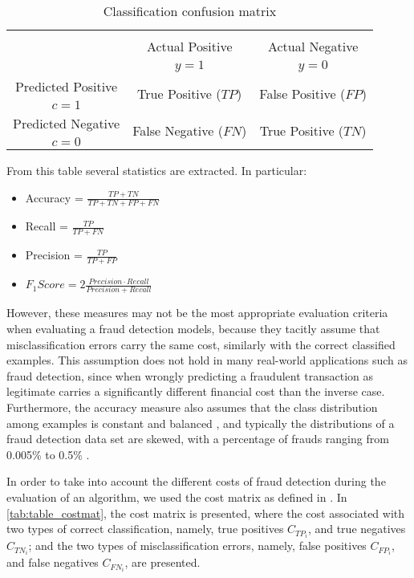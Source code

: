 	\begin{table}[b]
		\caption{Classification confusion matrix}
		\centering
    \begin{tabular}{c|c|c}
      \multicolumn{3}{c}{}\\
			\multicolumn{1}{c|}{}  & Actual Positive& Actual Negative \\
			\multicolumn{1}{c|}{} & $y=1$& $y=0$ \\
			\hline
			Predicted Positive 		& \multirow{ 2}{*}{True Positive ($TP$)} & \multirow{ 
			2}{*}{False Positive ($FP$)} \\
			$c=1$ & &\\
			\hline
			Predicted Negative  	& \multirow{ 2}{*}{False Negative ($FN$)} & \multirow{ 
			2}{*}{True Positive ($TN$)} \\
			$c=0$ & &\\
		\end{tabular}
		\label{confusion}
  \end{table}  

	From this table several statistics are extracted. In particular:
	\begin{itemize}
		\item Accuracy = $\frac{TP+TN}{TP+TN+FP+FN}$
		\item Recall = $\frac{TP}{TP+FN}$
		\item Precision = $\frac{TP}{TP+FP}$
		\item $F_1Score = 2\frac{Precision \cdot Recall}{Precision + Recall}$
	\end{itemize}

	However, these measures may not be the most appropriate evaluation criteria when  evaluating a 
	fraud detection models, because they tacitly assume that misclassification errors carry the same 
	cost, similarly with the correct classified examples. This assumption does not hold in many 
	real-world applications such as fraud detection, since  when wrongly predicting a fraudulent 
	transaction as legitimate carries a significantly different financial cost than the inverse case.
	Furthermore, the accuracy measure also assumes that the class distribution among examples is 
	constant and balanced \citep{Provost1998}, and typically the distributions of a fraud detection 
	data set are skewed, with a percentage of frauds ranging from 0.005\% to 0.5\% 
	\citep{Gadi2008,Bhattacharyya2011}.

	In order to take into account the different costs of fraud detection during the evaluation of an 
	algorithm, we used the cost matrix as defined in \citep{Elkan2001}. In \tablename{  
	\ref{tab:table_costmat}}, the cost matrix is presented, where the cost associated with two types 
	of correct classification, namely, true positives $C_{TP_i}$, and true negatives $C_{TN_i}$; and 
	the two types of misclassification errors, namely, false positives $C_{FP_i}$, and false 
	negatives  $C_{FN_i}$, are presented.

